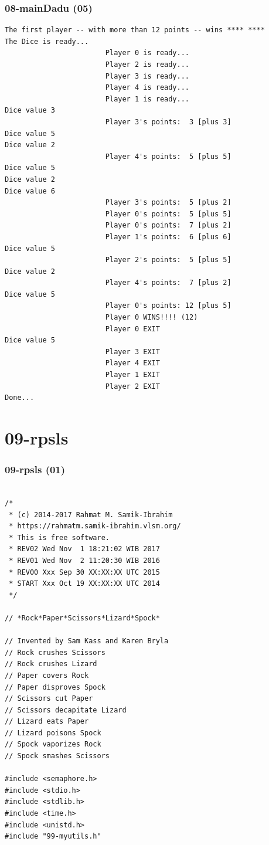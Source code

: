 \documentclass[aspectratio=169, xcolor=table, notheorems, hyperref={pdfpagelabels=false}]{beamer}
\begin{document}
\begin{frame}[fragile]
\frametitle{08-mainDadu (05)}
\begin{lstlisting}[basicstyle=\ttfamily\tiny]
The first player -- with more than 12 points -- wins **** ****
The Dice is ready...
                        Player 0 is ready...
                        Player 2 is ready...
                        Player 3 is ready...
                        Player 4 is ready...
                        Player 1 is ready...
Dice value 3
                        Player 3's points:  3 [plus 3] 
Dice value 5
Dice value 2
                        Player 4's points:  5 [plus 5] 
Dice value 5
Dice value 2
Dice value 6
                        Player 3's points:  5 [plus 2] 
                        Player 0's points:  5 [plus 5] 
                        Player 0's points:  7 [plus 2] 
                        Player 1's points:  6 [plus 6] 
Dice value 5
                        Player 2's points:  5 [plus 5] 
Dice value 2
                        Player 4's points:  7 [plus 2] 
Dice value 5
                        Player 0's points: 12 [plus 5] 
                        Player 0 WINS!!!! (12)
                        Player 0 EXIT
Dice value 5
                        Player 3 EXIT
                        Player 4 EXIT
                        Player 1 EXIT
                        Player 2 EXIT
Done...
\end{lstlisting}
\end{frame}

\section{09-rpsls}
\begin{frame}[fragile]
\frametitle{09-rpsls (01)}
\begin{lstlisting}[basicstyle=\ttfamily\tiny]

/*
 * (c) 2014-2017 Rahmat M. Samik-Ibrahim
 * https://rahmatm.samik-ibrahim.vlsm.org/
 * This is free software.
 * REV02 Wed Nov  1 18:21:02 WIB 2017
 * REV01 Wed Nov  2 11:20:30 WIB 2016
 * REV00 Xxx Sep 30 XX:XX:XX UTC 2015
 * START Xxx Oct 19 XX:XX:XX UTC 2014
 */

// *Rock*Paper*Scissors*Lizard*Spock*

// Invented by Sam Kass and Karen Bryla
// Rock crushes Scissors
// Rock crushes Lizard
// Paper covers Rock
// Paper disproves Spock
// Scissors cut Paper
// Scissors decapitate Lizard
// Lizard eats Paper
// Lizard poisons Spock
// Spock vaporizes Rock
// Spock smashes Scissors

#include <semaphore.h>
#include <stdio.h>
#include <stdlib.h>
#include <time.h>
#include <unistd.h>
#include "99-myutils.h"

\end{lstlisting}
\end{frame}
\end{document}
